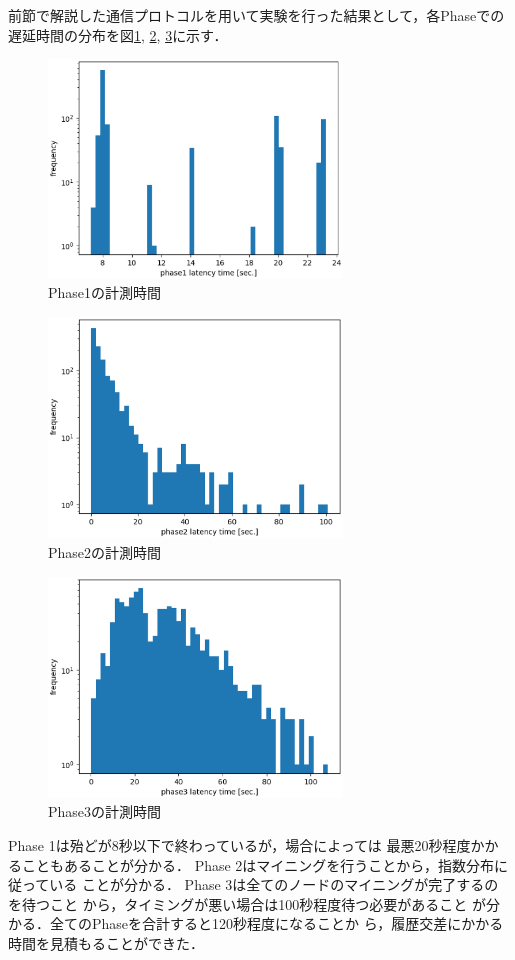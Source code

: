 \documentclass[a4paper,12pt]{jsarticle}
\begin{document}
前節で解説した通信プロトコルを用いて実験を行った結果として，各Phaseでの
遅延時間の分布を図\ref{fig:phase1}, \ref{fig:phase2}, \ref{fig:phase3}に示す．
%
\begin{figure}[tb]
  \begin{center}
    \includegraphics[width=78mm]{pht/phase1-sec-hist.eps}
  \end{center}
  \caption{Phase1の計測時間}
  \label{fig:phase1}
\end{figure}
%
%
\begin{figure}[tb]
  \begin{center}
    \includegraphics[width=78mm]{pht/phase2-sec-hist.eps}
  \end{center}
  \caption{Phase2の計測時間}
  \label{fig:phase2}
\end{figure}
%
%
\begin{figure}[tb]
  \begin{center}
    \includegraphics[width=78mm]{pht/phase3-sec-hist.eps}
  \end{center}
  \caption{Phase3の計測時間}
  \label{fig:phase3}
\end{figure}
%
Phase 1は殆どが8秒以下で終わっているが，場合によっては
最悪20秒程度かかることもあることが分かる．
Phase 2はマイニングを行うことから，指数分布に従っている
ことが分かる．
Phase 3は全てのノードのマイニングが完了するのを待つこと
から，タイミングが悪い場合は100秒程度待つ必要があること
が分かる．全てのPhaseを合計すると120秒程度になることか
ら，履歴交差にかかる時間を見積もることができた．
\end{document}

